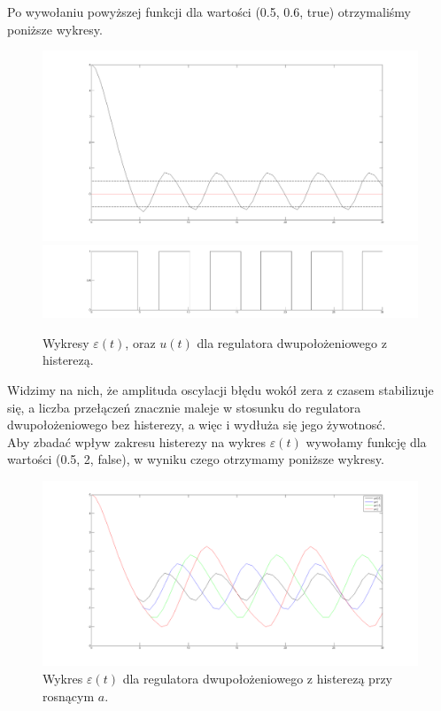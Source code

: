\documentclass[a4paper,10pt]{article}
\begin{document}
Po wywołaniu powyższej funkcji dla wartości (0.5, 0.6, true) otrzymaliśmy poniższe wykresy.

\begin{figure}[!h]
    \centering
	\includegraphics[width=120mm]{CW3-dwupolozeniowy-e-a05.png}
	\includegraphics[width=120mm]{CW3-dwupolozeniowy-u-a05.png}
	\caption{Wykresy $\varepsilon(t)$, oraz $u(t)$ dla regulatora dwupołożeniowego z histerezą.}
    \label{fig:Rysunek}
\end{figure}

Widzimy na nich, że amplituda oscylacji błędu wokół zera z czasem stabilizuje się, a liczba przełączeń znacznie maleje w stosunku do regulatora dwupołożeniowego bez histerezy, a więc i wydłuża się jego żywotnosć. \\
Aby zbadać wpływ zakresu histerezy na wykres $\varepsilon(t)$ wywołamy funkcję dla wartości (0.5, 2, false), w wyniku czego otrzymamy poniższe wykresy.

\begin{figure}[!h]
    \centering
	\includegraphics[width=120mm]{CW3-dwupolozeniowy-e.png}
	\caption{Wykres $\varepsilon(t)$ dla regulatora dwupołożeniowego z histerezą przy rosnącym $a$.}
    \label{fig:Rysunek}
\end{figure}
\end{document}
